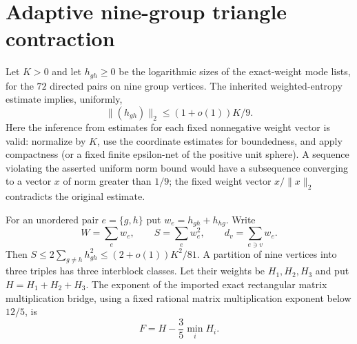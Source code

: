 \section{Adaptive nine-group triangle contraction}
Let $K>0$ and let $h_{gh}\ge0$ be the logarithmic sizes of the exact-weight
mode lists, for the $72$ directed pairs on nine group vertices. The inherited
weighted-entropy estimate implies, uniformly,
\[
 \|(h_{gh})\|_2\le (1+o(1))K/9.
\]
Here the inference from estimates for each fixed nonnegative weight vector is
valid: normalize by $K$, use the coordinate estimates for boundedness, and
apply compactness (or a fixed finite epsilon-net of the positive unit sphere).
A sequence violating the asserted uniform norm bound would have a subsequence
converging to a vector $x$ of norm greater than $1/9$; the fixed weight vector
$x/\|x\|_2$ contradicts the original estimate.

For an unordered pair $e=\{g,h\}$ put $w_e=h_{gh}+h_{hg}$. Write
\[
 W=\sum_e w_e,\qquad S=\sum_e w_e^2,
 \qquad d_v=\sum_{e\ni v}w_e.
\]
Then $S\le 2\sum_{g\ne h}h_{gh}^2\le(2+o(1))K^2/81$.
A partition of nine vertices into three triples has three interblock classes.
Let their weights be $H_1,H_2,H_3$ and put $H=H_1+H_2+H_3$.
The exponent of the imported exact rectangular matrix multiplication bridge,
using a fixed rational matrix multiplication exponent below $12/5$, is
\[
 F=H-\frac35\min_i H_i.
\]

